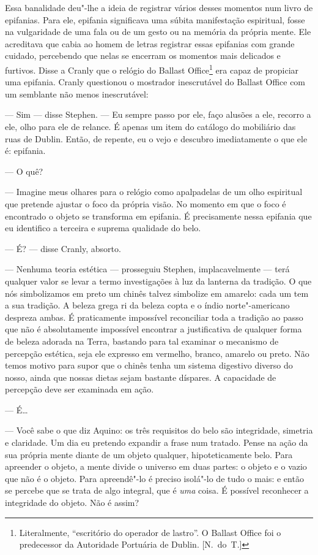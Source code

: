 Essa banalidade deu"-lhe a ideia de registrar vários desses momentos
num livro de epifanias.  Para ele,\label{refintro2} epifania significava uma súbita
manifestação espiritual, fosse na vulgaridade de uma fala ou de um
gesto ou na memória da própria mente.  Ele\label{refintro3} acreditava que cabia ao
homem de letras registrar essas epifanias com grande cuidado,
percebendo que nelas se encerram os momentos mais delicados e furtivos.
 Disse a Cranly que o relógio do Ballast \mbox{Office}\footnote{ Literalmente,
“escritório do operador de lastro”. O Ballast Office foi o predecessor
da Autoridade Portuária de Dublin. [N.~do~T.]} era capaz de propiciar uma
epifania.  Cranly questionou o mostrador inescrutável do Ballast Office
com um semblante não menos inescrutável:

--- Sim --- disse Stephen.  --- Eu sempre passo por ele, faço alusões
a ele, recorro a ele, olho para ele de relance.  É apenas um item do
catálogo do mobiliário das ruas de Dublin.  Então, de repente, eu o
vejo e descubro imediatamente o que ele é: epifania.

--- O quê?

--- Imagine meus olhares para o relógio como apalpadelas de um
olho espiritual que pretende ajustar o foco da própria visão.  No
momento em que o foco é encontrado o objeto se transforma em epifania. 
É precisamente nessa epifania que eu identifico a terceira e suprema
qualidade do belo.

--- É? --- disse Cranly, absorto.

--- Nenhuma teoria estética --- prosseguiu Stephen, implacavelmente
--- terá qualquer valor se levar a termo investigações à luz da lanterna
da tradição.  O que nós simbolizamos em preto um chinês talvez
simbolize em amarelo: cada um tem a sua tradição.  A beleza grega ri da
beleza copta e o índio norte"-americano despreza ambas.  É
praticamente impossível reconciliar toda a tradição ao passo que não é
absolutamente impossível encontrar a justificativa de qualquer forma de
beleza adorada na Terra, bastando para tal examinar o mecanismo de
percepção estética, seja ele expresso em vermelho, branco, amarelo ou
preto.  Não temos motivo para supor que o chinês tenha um sistema
digestivo diverso do nosso, ainda que nossas dietas sejam bastante
díspares.  A capacidade de percepção deve ser examinada em ação.

--- É\ldots{}

--- Você sabe o que diz Aquino: os três requisitos do belo são
integridade, simetria e claridade.  Um dia eu pretendo expandir a frase
num tratado.  Pense na ação da sua própria mente diante de um objeto
qualquer, hipoteticamente belo.  Para apreender o objeto, a mente divide
o universo em duas partes: o objeto e o vazio que não é o objeto.  Para
apreendê"-lo é preciso isolá"-lo de tudo o mais: e então se percebe que
se trata de algo integral, que é \textit{uma} coisa.  É possível
reconhecer a integridade do objeto.  Não é assim?


